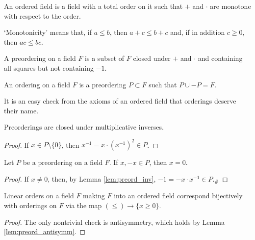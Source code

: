 \begin{definition}
  \label{def:ordered_field}
  \leanok
  An ordered field is a field with a total order on it such that $+$ and $\cdot$ are monotone with respect to the order.
\end{definition}

`Monotonicity' means that, if $a\leq b$, then $a+c\leq b+c$ and, if in addition $c\geq0$, then $ac\leq bc$.

\begin{definition}
  \label{def:preordering}
  \leanok
  A preordering on a field $F$ is a subset of $F$ closed under $+$ and $\cdot$ and containing all squares but not containing $-1$.
\end{definition}

\begin{definition}
  \label{def:ordering}
  \leanok
  An ordering on a field $F$ is a preordering $P\subset F$ such that $P\cup -P=F$.
\end{definition}

It is an easy check from the axioms of an ordered field that orderings deserve their name.

\begin{lemma}
  \label{lem:preord_inv}
  \leanok
  Preorderings are closed under multiplicative inverses.
\end{lemma}
\begin{proof}
  \leanok
  If $x\in P\setminus\{0\}$, then $x^{-1}=x\cdot(x^{-1})^2\in P$.
\end{proof}

\begin{lemma}
  \label{lem:preord_antisymm}
  \leanok
  Let $P$ be a preordering on a field $F$. If $x,-x\in P$, then $x=0$.
\end{lemma}
\begin{proof}
  \leanok
  If $x\neq0$, then, by Lemma \ref{lem:preord_inv}, $-1=-x\cdot x^{-1}\in P$.$_\#$
\end{proof}

\begin{lemma}
  \label{lem:linord_fieldord_bij}
  \leanok
  Linear orders on a field $F$ making $F$ into an ordered field correspond bijectively with orderings on $F$ via the map $(\leq)\to\{x\geq0\}$.
\end{lemma}
\begin{proof}
  \leanok
  The only nontrivial check is antisymmetry, which holds by Lemma \ref{lem:preord_antisymm}.
\end{proof}

